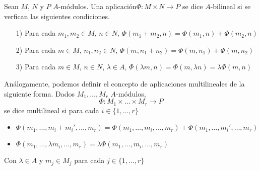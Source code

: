 \documentclass[../main.tex]{subfiles}
\begin{document}
\begin{definition} Sean $M$, $N$ y $P$ $A$-módulos. Una aplicación$\Phi:M\times N\longrightarrow P$ se dice $A$-bilineal si se verfican las siguientes condiciones.
\begin{itemize}
    \item [1)] Para cada $m_1,m_2\in M$, $n\in N$, $\Phi(m_1+m_2,n)=\Phi(m_1,n)+\Phi(m_2,n)$
    \item [2)] Para cada $m\in M$, $n_1,n_2\in N$, $\Phi(m,n_1+n_2)=\Phi(m,n_1)+\Phi(m,n_2)$
    \item [3)] Para cada $m\in M$, $n\in N$, $\lambda\in A$, $\Phi(\lambda m,n)=\Phi(m,\lambda n)=\lambda\Phi(m,n)$
\end{itemize}
\end{definition}
\begin{remark} Análogamente, podemos definir el concepto de aplicaciones multilineales de la siguiente forma. Dados $M_1,\dots ,M_r$ $A$-módulos,$$\Phi:M_1\times\dots\times M_r\longrightarrow P$$ se dice multilineal si para cada $i\in\{1,\dots,r\}$\begin{itemize}
    \item $\Phi(m_1,\dots,m_i+m_i',\dots,m_r)=\Phi(m_1,\dots,m_i,\dots,m_r)+\Phi(m_1,\dots,m_i',\dots,m_r)$
    \item $\Phi(m_1,\dots,\lambda m_i,\dots,m_r)=\lambda\Phi(m_1,\dots,m_i,\dots,m_r)$
\end{itemize}
Con $\lambda\in A$ y $m_j\in M_j$ para cada $j\in\{1,\dots,r\}$
\end{remark}
\end{document}
